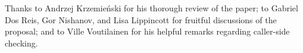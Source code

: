 
Thanks to Andrzej Krzemie\' nski for his thorough review of the paper; to Gabriel Dos Reis, Gor Nishanov, and Lisa Lippincott for fruitful discussions of the proposal; and to Ville Voutilainen for his helpful remarks regarding caller-side checking.


\renewcommand{\addcontentsline}[3]{}%







